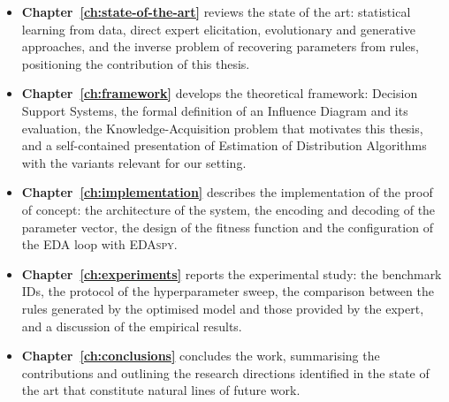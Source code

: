 \begin{itemize}
    \item \textbf{Chapter~\ref{ch:state-of-the-art}} reviews the state of the
          art: statistical learning from data, direct expert elicitation,
          evolutionary and generative approaches, and the inverse problem of
          recovering parameters from rules, positioning the contribution of this
          thesis.
    \item \textbf{Chapter~\ref{ch:framework}} develops the
          theoretical framework: Decision Support Systems, the
          formal definition of an Influence Diagram and its
          evaluation, the Knowledge-Acquisition problem that
          motivates this thesis, and a self-contained presentation
          of Estimation of Distribution Algorithms with the variants
          relevant for our setting.
    \item \textbf{Chapter~\ref{ch:implementation}} describes the
          implementation of the proof of concept: the architecture
          of the system, the encoding and decoding of the parameter
          vector, the design of the fitness function and the
          configuration of the EDA loop with \textsc{EDAspy}.
    \item \textbf{Chapter~\ref{ch:experiments}} reports the experimental study:
          the benchmark IDs, the protocol of the hyperparameter sweep,
          the comparison between the rules generated by the
          optimised model and those provided by the expert, and a
          discussion of the empirical results.
    \item \textbf{Chapter~\ref{ch:conclusions}} concludes the work, summarising the
          contributions and outlining the research directions
          identified in the state of the art that constitute
          natural lines of future work.
\end{itemize}
